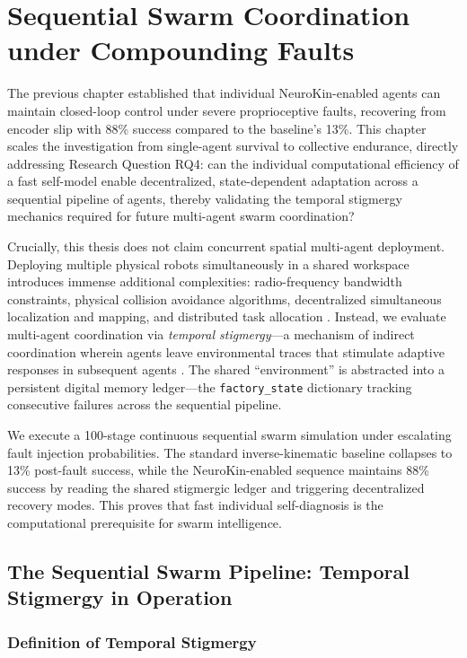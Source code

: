 \documentclass[12pt,a4paper,oneside]{report}
\begin{document}
\chapter{Sequential Swarm Coordination under Compounding Faults}
\label{chap:sequential_swarm_coordination}

The previous chapter established that individual NeuroKin-enabled agents can maintain closed-loop control under severe proprioceptive faults, recovering from encoder slip with 88\% success compared to the baseline's 13\%. This chapter scales the investigation from single-agent survival to collective endurance, directly addressing Research Question RQ4: can the individual computational efficiency of a fast self-model enable decentralized, state-dependent adaptation across a sequential pipeline of agents, thereby validating the temporal stigmergy mechanics required for future multi-agent swarm coordination?

Crucially, this thesis does not claim concurrent spatial multi-agent deployment. Deploying multiple physical robots simultaneously in a shared workspace introduces immense additional complexities: radio-frequency bandwidth constraints, physical collision avoidance algorithms, decentralized simultaneous localization and mapping, and distributed task allocation \cite{matsuki2024gaussian, keetha2024splattam}. Instead, we evaluate multi-agent coordination via \textit{temporal stigmergy}---a mechanism of indirect coordination wherein agents leave environmental traces that stimulate adaptive responses in subsequent agents \cite{bongard2006resilient}. The shared ``environment'' is abstracted into a persistent digital memory ledger---the \texttt{factory\_state} dictionary tracking consecutive failures across the sequential pipeline.

We execute a 100-stage continuous sequential swarm simulation under escalating fault injection probabilities. The standard inverse-kinematic baseline collapses to 13\% post-fault success, while the NeuroKin-enabled sequence maintains 88\% success by reading the shared stigmergic ledger and triggering decentralized recovery modes. This proves that fast individual self-diagnosis is the computational prerequisite for swarm intelligence.
\section{The Sequential Swarm Pipeline: Temporal Stigmergy in Operation}
\subsection{Definition of Temporal Stigmergy}
\label{subsec:definition_of_temporal_stigmergy}
\end{document}
